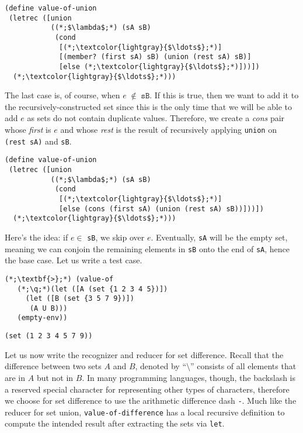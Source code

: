 \begin{cl}[]{}\begin{lstlisting}[language=MyScheme]
(define value-of-union
 (letrec ([union 
           ((*;$\lambda$;*) (sA sB)
            (cond
             [(*;\textcolor{lightgray}{$\ldots$};*)]
             [(member? (first sA) sB) (union (rest sA) sB)]
             [else (*;\textcolor{lightgray}{$\ldots$};*)]))])
  (*;\textcolor{lightgray}{$\ldots$};*)))
\end{lstlisting}\end{cl}

The last case is, of course, when $e\;\not\in\;\texttt{sB}$. If this is true, then we want to add it to the recursively-constructed set since this is the only time that we will be able to add $e$ as sets do not contain duplicate values. Therefore, we create a \textit{cons} pair whose \textit{first} is $e$ and whose \textit{rest} is the result of recursively applying \texttt{union} on \texttt{(rest sA)} and \texttt{sB}. 

\begin{cl}[]{}\begin{lstlisting}[language=MyScheme]
(define value-of-union
 (letrec ([union 
           ((*;$\lambda$;*) (sA sB)
            (cond
             [(*;\textcolor{lightgray}{$\ldots$};*)]
             [else (cons (first sA) (union (rest sA) sB))]))])
  (*;\textcolor{lightgray}{$\ldots$};*)))
\end{lstlisting}\end{cl}

Here's the idea: if $e\in$ \texttt{sB}, we skip over $e$. Eventually, \texttt{sA} will be the empty set, meaning we can conjoin the remaining elements in \texttt{sB} onto the end of \texttt{sA}, hence the base case. Let us write a test case.

\begin{cloast}[]{}
\begin{lstlisting}[language=MyNLNSOutput]
(*;\textbf{>};*) (value-of 
   (*;\q;*)(let ([A (set {1 2 3 4 5})])
     (let ([B (set {3 5 7 9})])
      (A U B)))
   (empty-env))
\end{lstlisting}
\tcblower
\begin{lstlisting}[language=MyOutput]
(set (1 2 3 4 5 7 9))
\end{lstlisting}
\end{cloast}

Let us now write the recognizer and reducer for set difference. Recall that the difference between two sets $A$ and $B$, denoted by ``$\setminus$'' consists of all elements that are in $A$ but not in $B$. In many programming languages, though, the backslash is a reserved special character for representing other types of characters, therefore we choose for set difference to use the arithmetic difference dash \texttt{-}. Much like the reducer for set union, \texttt{value-of-difference} has a local recursive definition to compute the intended result after extracting the sets via \texttt{let}.

